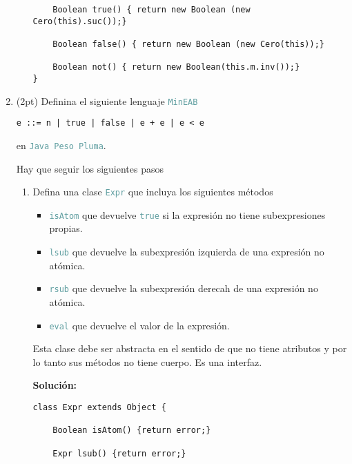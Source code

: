 \documentclass{article}
\newcommand{\tp}[1]{\textcolor{CadetBlue} {\texttt{#1}}}
\newcommand{\tb}[1]{\textcolor{RoyalPurple} {\textbf{#1}}}
\newcommand{\pt}[1]{\textcolor{RoyalPurple}{(#1pt)}}
\begin{document}
\begin{enumerate}
\begin{enumerate}
\begin{verbatim}
    Boolean true() { return new Boolean (new Cero(this).suc());}

    Boolean false() { return new Boolean (new Cero(this));}

    Boolean not() { return new Boolean(this.m.inv());}
}
            \end{verbatim}
        \end{enumerate}

        \item \pt{2} Definina el siguiente lenguaje \tp{MinEAB}

        \begin{verbatim}
e ::= n | true | false | e + e | e < e
        \end{verbatim}

        en \tp{Java Peso Pluma}.

        Hay que seguir los siguientes pasos

        \begin{enumerate}
            \item Defina una clase \tp{Expr} que incluya los siguientes métodos

            \begin{itemize}
                \item \tp{isAtom} que devuelve \tp{true} si la expresión no
                tiene subexpresiones propias.

                \item \tp{lsub} que devuelve la subexpresión izquierda de una
                expresión no atómica.

                \item \tp{rsub} que devuelve la subexpresión derecah de una
                expresión no atómica.

                \item \tp{eval} que devuelve el valor de la expresión.
            \end{itemize}

            Esta clase debe ser abstracta en el sentido de que no tiene
            atributos y por lo tanto sus métodos no tiene cuerpo. Es una
            interfaz.

            \tb{Solución:}

            \begin{verbatim}
class Expr extends Object {

    Boolean isAtom() {return error;}

    Expr lsub() {return error;}


\end{verbatim}
\end{enumerate}
\end{enumerate}
\end{document}
